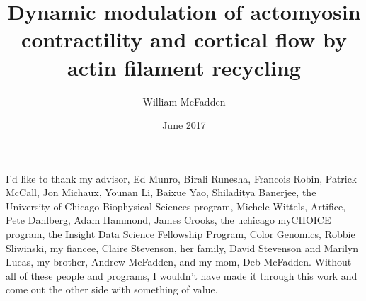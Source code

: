\documentclass{ucetd}
\begin{document}
\title{Dynamic modulation of actomyosin contractility and cortical flow by actin filament recycling} 
\author{William McFadden}
\date{June 2017}

\dedication{ For Claire, you kept me going.}




 

\maketitle

\makecopyright
\makededication


\tableofcontents
\listoffigures
\listoftables

\acknowledgments
I'd like to thank my advisor, Ed Munro, Birali Runesha, Francois Robin, Patrick McCall, Jon Michaux, Younan Li, Baixue Yao, Shiladitya Banerjee, the University of Chicago Biophysical Sciences program, Michele Wittels, Artifice, Pete Dahlberg, Adam Hammond, James Crooks, the uchicago myCHOICE program, the Insight Data Science Fellowship Program, Color Genomics, Robbie Sliwinski, my fiancee, Claire Stevenson, her family, David Stevenson and Marilyn Lucas, my brother, Andrew McFadden, and my mom, Deb McFadden.  Without all of these people and programs, I wouldn't have made it through this work and come out the other side with something of value.
\end{document}
